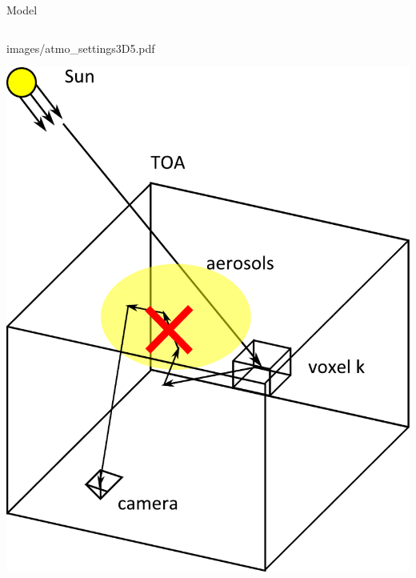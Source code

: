 \documentclass[compress,red,12pt]{beamer}
\begin{document}
\begin{frame}{Model}
\begin{columns}[c]
\begin{overlayarea}{\columnwidth}{8cm}
{{          {images/atmo_settings3D5.pdf}}}
       {\centerline{\includegraphics[width=\columnwidth]
          {images/atmo_settings3D6.pdf}}}
    \end{overlayarea}
\end{columns}
\end{frame}
\end{document}
